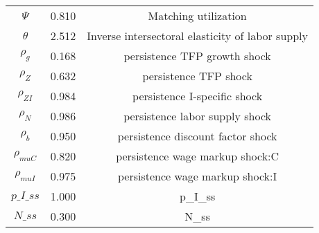 \begin{center}
\begin{longtable}{ccc}
${\Psi}$ 	 & 	 0.810 	 & 	 Matching utilization\\
${\theta}$ 	 & 	 2.512 	 & 	 Inverse intersectoral elasticity of labor supply\\
${\rho_g}$ 	 & 	 0.168 	 & 	 persistence TFP growth shock\\
${\rho_Z}$ 	 & 	 0.632 	 & 	 persistence TFP shock\\
${\rho_{ZI}}$ 	 & 	 0.984 	 & 	 persistence I-specific shock\\
${\rho_N}$ 	 & 	 0.986 	 & 	 persistence labor supply shock\\
${\rho_b}$ 	 & 	 0.950 	 & 	 persistence discount factor shock\\
${\rho_{muC}}$ 	 & 	 0.820 	 & 	 persistence wage markup shock:C\\
${\rho_{muI}}$ 	 & 	 0.975 	 & 	 persistence wage markup shock:I\\
$p\_I\_ss$ 	 & 	 1.000 	 & 	 p\_I\_ss\\
$N\_ss$ 	 & 	 0.300 	 & 	 N\_ss\\
\bottomrule%
\end{longtable}
\end{center}
